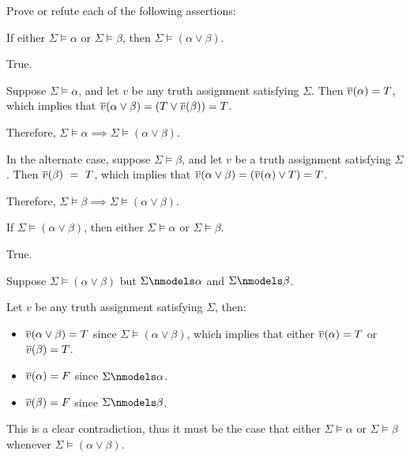 

\begin{problem}
  Prove or refute each of the following assertions:
  \begin{enumalph}
    \item If either $\Sigma \models \alpha$ or $\Sigma \models \beta$,
      then $\Sigma \models (\alpha \lor \beta)$.
      \begin{Answer}
        True.
        
        \step
        Suppose $\Sigma \models \alpha$, and let $v$ be any truth assignment satisfying $\Sigma$.
        Then $\overline{v}(\alpha) = T$, which implies that $\overline{v}(\alpha \lor \beta)
        = (T \lor \overline{v}(\beta)) = T$.

        \noindent
        Therefore, $\Sigma \models \alpha \implies \Sigma \models (\alpha \lor \beta)$.

        \step
        In the alternate case, suppose $\Sigma \models \beta$,
        and let $v$ be a truth assignment satisfying $\Sigma$.
        Then $\overline{v}(\beta)~=~T$, which implies that $\overline{v}(\alpha \lor \beta)
        = (\overline{v}(\alpha) \lor T) = T$.

        \noindent
        Therefore, $\Sigma \models \beta \implies \Sigma \models (\alpha \lor \beta)$.
      \end{Answer}
    \item If $\Sigma \models (\alpha \lor \beta)$, then either $\Sigma \models \alpha$
      or $\Sigma \models \beta$.
      \begin{Answer}
        True.

        \step
        Suppose $\Sigma \models (\alpha \lor \beta)$ but $\Sigma \nmodels \alpha$ and $\Sigma \nmodels \beta$.

        \noindent
        Let $v$ be any truth assignment satisfying $\Sigma$, then:
        \begin{itemize}
          \item $\overline{v}(\alpha \lor \beta) = T$ since $\Sigma \models (\alpha \lor \beta)$,
            which implies that either $\overline{v}(\alpha) = T$ or $\overline{v}(\beta) = T$.
          \item $\overline{v}(\alpha) = F$ since $\Sigma \nmodels \alpha$.
          \item $\overline{v}(\beta) = F$ since $\Sigma \nmodels \beta$.
        \end{itemize}
        This is a clear contradiction, thus it must be the case that either
        $\Sigma \models \alpha$ or $\Sigma \models \beta$ whenever $\Sigma \models (\alpha \lor \beta)$.
      \end{Answer}
  \end{enumalph}
\end{problem}


